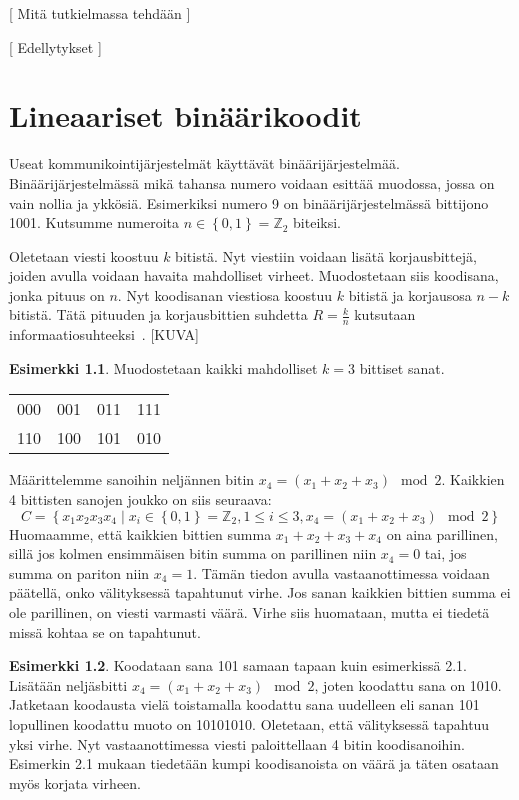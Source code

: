 \documentclass[a4paper,12pt,leqno,oneside]{report} %
\theoremstyle{plain}
\theoremstyle{definition}
\newtheorem{esimerkki}{Esimerkki}[chapter]
\theoremstyle{remark}
\numberwithin{equation}{chapter}
\newcommand*{\Zset}{\mathbb{Z}}  %
\begin{document}
    [ Mitä tutkielmassa tehdään ]



    [ Edellytykset ]

    \chapter{Lineaariset binäärikoodit}\label{ch: Lineaariset binäärikoodit}

    Useat kommunikointijärjestelmät käyttävät binäärijärjestelmää. Binäärijärjestelmässä mikä tahansa numero voidaan esittää muodossa, jossa on vain nollia ja ykkösiä. Esimerkiksi numero 9 on binäärijärjestelmässä bittijono 1001. Kutsumme numeroita $n \in \left\{ 0, 1 \right\} = \Zset_2$ biteiksi.

    Oletetaan viesti koostuu $k$ bitistä. Nyt viestiin voidaan lisätä korjausbittejä, joiden avulla voidaan havaita mahdolliset virheet. Muodostetaan siis koodisana, jonka pituus on $n$. Nyt koodisanan viestiosa koostuu $k$ bitistä ja korjausosa $n-k$ bitistä. Tätä pituuden ja korjausbittien suhdetta $R = \frac{k}{n}$ kutsutaan informaatiosuhteeksi~\cite[s.~267]{GW}.
    [KUVA]
    \begin{esimerkki}
        Muodostetaan kaikki mahdolliset $k = 3$ bittiset sanat.
        \begin{center}
            \begin{tabular}[t]{llll}
                000 & 001 & 011 & 111 \\
                110 & 100 & 101 & 010 \\
            \end{tabular}
        \end{center}
        Määrittelemme sanoihin neljännen bitin $x_4 = (x_1 + x_2 + x_3) \mod2$. Kaikkien 4 bittisten sanojen joukko on siis seuraava:
        \[
            C = \left\{ x_1x_2x_3x_4 \mid  x_i \in \left\{0,1\right\} = \Zset_2, 1 \le i \le 3, x_4 = (x_1 + x_2 + x_3) \mod2\right\}
        \]
        Huomaamme, että kaikkien bittien summa $x_1 + x_2 + x_3 + x_4$ on aina parillinen, sillä jos kolmen ensimmäisen bitin summa on parillinen niin $x_4 = 0$ tai, jos summa on pariton niin $x_4 = 1$.
        Tämän tiedon avulla vastaanottimessa voidaan päätellä, onko välityksessä tapahtunut virhe. Jos sanan kaikkien bittien summa ei ole parillinen, on viesti varmasti väärä. Virhe siis huomataan, mutta ei tiedetä missä kohtaa se on tapahtunut.
    \end{esimerkki}
    \begin{esimerkki}
        Koodataan sana 101 samaan tapaan kuin esimerkissä 2.1. Lisätään neljäsbitti $x_4 = (x_1 + x_2 + x_3) \mod2$, joten koodattu sana on 1010. Jatketaan koodausta vielä toistamalla koodattu sana uudelleen eli sanan 101 lopullinen koodattu muoto on 10101010. Oletetaan, että välityksessä tapahtuu yksi virhe. Nyt vastaanottimessa viesti paloittellaan 4 bitin koodisanoihin. Esimerkin 2.1 mukaan tiedetään kumpi koodisanoista on väärä ja täten osataan myös korjata virheen.
    \end{esimerkki}
\end{document}
